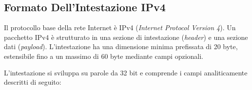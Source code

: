 \documentclass[11pt, a4paper]{article}
\begin{document}
\subsection{Formato Dell'Intestazione IPv4}

Il protocollo base della rete Internet è IPv4 (\emph{Internet Protocol Version 4}). Un pacchetto IPv4 è strutturato in una sezione di intestazione (\emph{header}) e una sezione dati (\emph{payload}). L'intestazione ha una dimensione minima prefissata di 20 byte, estensibile fino a un massimo di 60 byte mediante campi opzionali.


L'intestazione si sviluppa su parole da 32 bit e comprende i campi analiticamente descritti di seguito:
\end{document}
